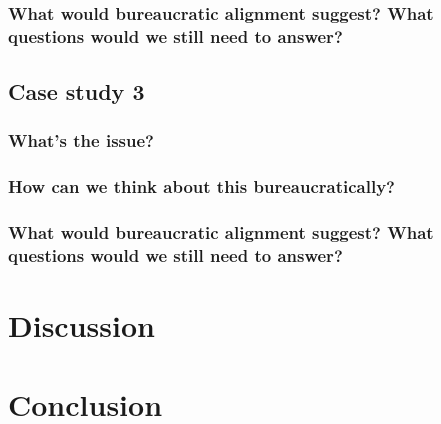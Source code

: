 \documentclass[main]{subfiles}
\begin{document}
\subsubsection{What would bureaucratic alignment suggest? What questions would we still need to answer?}

\subsection{Case study 3}
\subsubsection{What's the issue?}
\subsubsection{How can we think about this bureaucratically?}
\subsubsection{What would bureaucratic alignment suggest? What questions would we still need to answer?}

\section{Discussion}
\section{Conclusion}



\onlyinsubfile{
  
  
}
\end{document}
